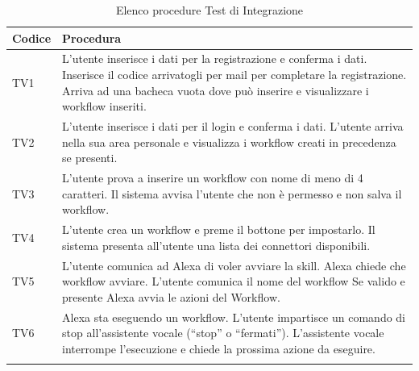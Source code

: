 \begin{center}
	\centering
	\renewcommand{\arraystretch}{1.5}
	\begin{longtable}{  p{1.5cm}  p{12.5cm} }
		\rowcolor{tableHeadYellow}
		\textbf{Codice}   & \textbf{Procedura}  \\ 
		\endhead		
		TV1 & L’utente inserisce i dati per la registrazione e conferma i dati. Inserisce il codice arrivatogli per mail per completare la registrazione. Arriva ad una bacheca vuota dove può inserire e visualizzare i workflow inseriti. \\
		TV2 & L’utente inserisce i dati per il login e conferma i dati. L’utente arriva nella sua area personale e visualizza i workflow creati in precedenza se presenti. \\
		TV3 & L’utente prova a inserire un workflow con nome di meno di 4 caratteri. Il sistema avvisa l'utente che non è permesso e non salva il workflow. \\
		TV4 & L’utente crea un workflow e preme il bottone per impostarlo. Il sistema presenta all’utente una lista dei connettori disponibili. \\
		TV5 & L’utente comunica ad Alexa di voler avviare la skill. Alexa chiede che workflow avviare. L’utente comunica il nome del workflow Se valido e presente Alexa avvia le azioni del Workflow. \\
		TV6 & Alexa sta eseguendo un workflow. L’utente impartisce un comando di stop all’assistente vocale (“stop” o “fermati”). L’assistente vocale interrompe l’esecuzione e chiede la prossima azione da eseguire. \\
		\rowcolor{white}
		\caption{Elenco procedure Test di Integrazione}
	\end{longtable}
\end{center}
\pagebreak
